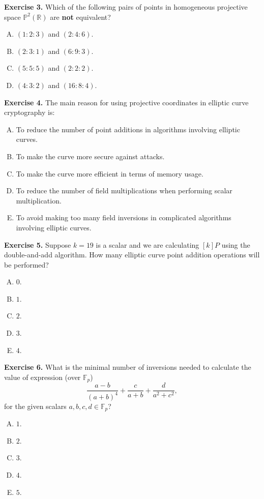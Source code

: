 \documentclass[../lecture-notes.tex]{subfiles}
\begin{document}
\textbf{Exercise 3.} Which of the following pairs of points in homogeneous projective space $\mathbb{P}^2(\mathbb{R})$ are \textbf{not} equivalent?
\begin{enumerate}[(A)]
    \item $(1:2:3)$ and $(2:4:6)$.
    \item $(2:3:1)$ and $(6:9:3)$.
    \item $(5:5:5)$ and $(2:2:2)$.
    \item $(4:3:2)$ and $(16:8:4)$.
\end{enumerate}

\textbf{Exercise 4.} The main reason for using projective coordinates in elliptic curve cryptography is:
\begin{enumerate}[(A)]
    \item To reduce the number of point additions in algorithms involving elliptic curves.
    \item To make the curve more secure against attacks.
    \item To make the curve more efficient in terms of memory usage.
    \item To reduce the number of field multiplications when performing scalar multiplication.
    \item To avoid making too many field inversions in complicated algorithms involving elliptic curves.
\end{enumerate}

\textbf{Exercise 5.} Suppose $k=19$ is a scalar and we are calculating $[k]P$ using the double-and-add algorithm. How many elliptic curve point addition operations will be performed?
\begin{enumerate}[(A)]
    \item $0$.
    \item $1$.
    \item $2$.
    \item $3$.
    \item $4$.
\end{enumerate}

\textbf{Exercise 6.} What is the minimal number of inversions needed to calculate the value of expression (over $\mathbb{F}_p$)
\begin{equation*}
    \frac{a-b}{(a+b)^4} + \frac{c}{a+b} + \frac{d}{a^2+c^2},
\end{equation*}
for the given scalars $a,b,c,d \in \mathbb{F}_p$?
\begin{enumerate}[(A)]
    \item $1$.
    \item $2$.
    \item $3$.
    \item $4$.
    \item $5$.
\end{enumerate}
\end{document}
